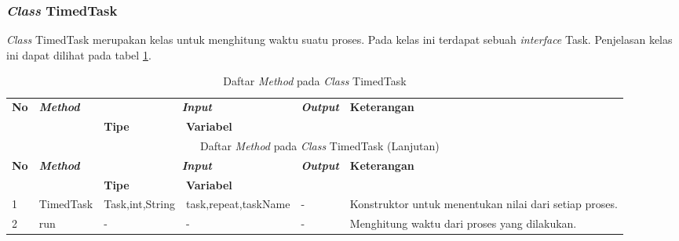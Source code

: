 \subsubsection{\textit{Class} TimedTask}
\noindent \textit{Class} TimedTask merupakan kelas untuk menghitung waktu suatu proses. Pada kelas ini terdapat sebuah \textit{interface} Task. Penjelasan kelas ini dapat dilihat pada tabel \ref{tbl:classTimedTask}.
\begingroup
\setlength{\LTleft}{-20cm plus -1fill}
\setlength{\LTright}{\LTleft}
\begin{small}
\begin{longtable}{|p{0.4cm}|p{2cm}|p{1.8cm}|p{1.8cm}|p{1.7cm}|p{3.55cm}|}
	\caption{Daftar \textit{Method} pada \textit{Class} TimedTask \label{tbl:classTimedTask}}\\
	\hline
	\multirow{2}{*}{\textbf{No}} & \multirow{2}{*}{\textit{\textbf{Method}}} & \multicolumn{2}{c|}{\textit{\textbf{Input}}} & \multirow{2}{*}{\textit{\textbf{Output}}} & 
	\multirow{2}{*}{\textbf{Keterangan}}\\
	\cline{3-4}
	& & \textbf{Tipe} & \textbf{Variabel} & & \\
	\endfirsthead
	\multicolumn{6}{c}{\textbf{\tablename~\thetable} Daftar \textit{Method} pada \textit{Class} TimedTask (Lanjutan)} \\
	\hline
	\multirow{2}{*}{\textbf{No}} & \multirow{2}{*}{\textit{\textbf{Method}}} & \multicolumn{2}{c|}{\textit{\textbf{Input}}} & \multirow{2}{*}{\textit{\textbf{Output}}} & 
	\multirow{2}{*}{\textbf{Keterangan}}\\
	\cline{3-4}
	& & \textbf{Tipe} & \textbf{Variabel} & & \\
	\endhead
	\hline
	1 & TimedTask & Task,\newline int,\newline String & task,\newline repeat,\newline taskName & - & Konstruktor untuk menentukan nilai dari setiap proses.\\
	\hline
	2 & run & - & - & - & Menghitung waktu dari proses yang dilakukan.\\
	\hline
\end{longtable}
\end{small}
\endgroup

